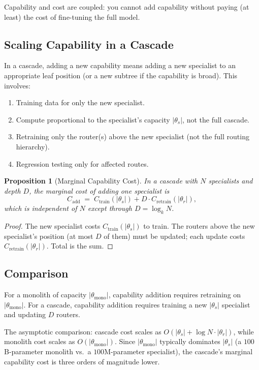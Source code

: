 \documentclass[11pt,a4paper]{article}
\newtheorem{proposition}[theorem]{Proposition}
\theoremstyle{definition}
\theoremstyle{remark}
\begin{document}
Capability and cost are coupled: you cannot add capability without paying (at least) the cost of fine-tuning the full model.

\subsection{Scaling Capability in a Cascade}

In a cascade, adding a new capability means adding a new specialist to an appropriate leaf position (or a new subtree if the capability is broad). This involves:
\begin{enumerate}
    \item Training data for only the new specialist.
    \item Compute proportional to the specialist's capacity $|\theta_s|$, not the full cascade.
    \item Retraining only the router(s) above the new specialist (not the full routing hierarchy).
    \item Regression testing only for affected routes.
\end{enumerate}

\begin{proposition}[Marginal Capability Cost]
\label{prop:marginal}
In a cascade with $N$ specialists and depth $D$, the marginal cost of adding one specialist is
\[
C_{\text{add}} \;=\; C_{\text{train}}(|\theta_s|) + D \cdot C_{\text{retrain}}(|\theta_r|),
\]
which is independent of $N$ except through $D = \log_k N$.
\end{proposition}

\begin{proof}
The new specialist costs $C_{\text{train}}(|\theta_s|)$ to train. The routers above the new specialist's position (at most $D$ of them) must be updated; each update costs $C_{\text{retrain}}(|\theta_r|)$. Total is the sum.
\end{proof}

\subsection{Comparison}

For a monolith of capacity $|\theta_{\text{mono}}|$, capability addition requires retraining on $|\theta_{\text{mono}}|$. For a cascade, capability addition requires training a new $|\theta_s|$ specialist and updating $D$ routers.

The asymptotic comparison: cascade cost scales as $O(|\theta_s| + \log N \cdot |\theta_r|)$, while monolith cost scales as $O(|\theta_{\text{mono}}|)$. Since $|\theta_{\text{mono}}|$ typically dominates $|\theta_s|$ (a $100$B-parameter monolith vs.\ a $100$M-parameter specialist), the cascade's marginal capability cost is three orders of magnitude lower.
\end{document}
